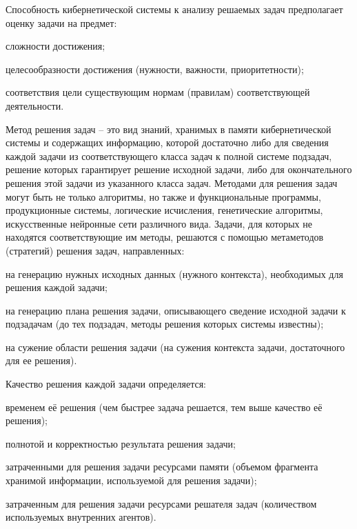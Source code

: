 Способность кибернетической системы к анализу решаемых задач предполагает оценку задачи на предмет:
\begin{textitemize}
    \item сложности достижения;
    \item целесообразности достижения (нужности, важности, приоритетности);
    \item соответствия цели существующим нормам (правилам) соответствующей деятельности.
\end{textitemize}


Метод решения задач – это вид знаний, хранимых в памяти кибернетической системы и содержащих информацию, которой достаточно либо для сведения каждой задачи из соответствующего класса задач к полной системе подзадач, решение которых гарантирует решение исходной задачи, либо для окончательного решения этой задачи из указанного класса задач. 
Методами для решения задач могут быть не только алгоритмы, но также и функциональные программы, продукционные системы, логические исчисления, генетические алгоритмы, искусственные нейронные сети различного вида.
Задачи, для которых не находятся соответствующие им методы, решаются с помощью метаметодов (стратегий) решения задач, направленных:
\begin{textitemize}
    \item на генерацию нужных исходных данных (нужного контекста), необходимых для решения каждой задачи;
    \item на генерацию плана решения задачи, описывающего сведение исходной задачи к подзадачам (до тех подзадач, методы решения которых системы известны);
    \item на сужение области решения задачи (на сужения контекста задачи, достаточного для ее решения).
\end{textitemize}

Качество решения каждой задачи определяется:
\begin{textitemize}
    \item временем её решения (чем быстрее задача решается, тем выше качество её решения);
    \item полнотой и корректностью результата решения задачи;
    \item затраченными для решения задачи ресурсами памяти (объемом фрагмента хранимой информации, используемой для решения задачи);
    \item затраченным для решения задачи ресурсами решателя задач (количеством используемых внутренних агентов).
\end{textitemize}


